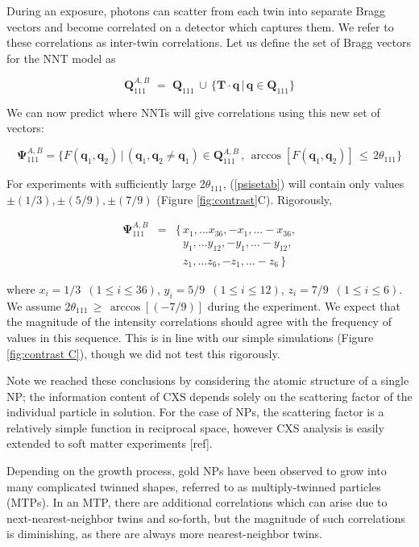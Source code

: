 \documentclass [11pt,fleqn]{article}
\def \be {\begin{equation}}
\def \ee {\end{equation}}
\def \beq {\begin{eqnarray}}
\def \eeq {\end{eqnarray}}
\begin{document}
During an exposure, photons can scatter from each twin into separate Bragg vectors and become correlated on a detector which captures them. We refer to these correlations as inter-twin correlations. Let us define the set of Bragg vectors for the NNT model as 

\be
\bm Q^{A,B}_{111}\,\, =\,\, \bm Q_{111} \, \cup \, \{  \mathbf T  \cdot \bm q \, \big |\, \bm q \in \bm Q_{111} \}
\ee

We can now predict where NNTs will give correlations using this new set of vectors: 

\be \label{psisetab}
\bm \Psi^{A,B}_{111} = \{ F( \bm q_1, \bm q_2)\, \big | \, (\bm q_1, \bm q_2 \ne \bm q_1) \in \bm Q^{A,B}_{111}\, ,\,  \arccos [F( \bm q_1, \bm q_2)]  \, \le \,  2\theta_{111}     \}
\ee

For experiments with sufficiently large $2\theta_{111}$, (\ref{psisetab}) will contain only values $\pm (1/3), \pm (5/9), \pm(7/9)$ (Figure \ref{fig:contrast}C). Rigorously, 

\beq
\bm \Psi^{A,B}_{111} &=& \{\, x_1, ... x_{36}, -x_1, ... -x_{36},  \\
&&\,\,\,\, y_1, ... y_{12}, -y_1, ... -y_{12}, \\
&& \,\,\,\, z_1, ... z_6, -z_1, ... -z_6 \, \}
\eeq

where $x_i = 1/3\,\,\, (1 \le i \le 36 )$, $y_i = 5/9\,\,\, (1 \le i \le 12 )$, $z_i = 7/9\,\,\, (1 \le i \le 6 )$.  We assume $  2\theta_{111} \, \ge \, \arccos \left[(-7/9)\right ]  $ during the experiment. We expect that the magnitude of the intensity correlations should agree with the frequency of values in this sequence. This is in line with our simple simulations (Figure \ref{fig:contrast C}), though we did not test this rigorously.

Note we reached these conclusions by considering the atomic structure of a single NP; the information content of CXS depends solely on the scattering factor of the individual particle in solution. For the case of NPs, the scattering factor is a relatively simple function in reciprocal space, however CXS analysis is easily extended to soft matter experiments [ref].

Depending on the growth process, gold NPs have been observed to grow into many complicated twinned shapes, referred to as multiply-twinned particles (MTPs). In an MTP, there are additional correlations which can arise due to next-nearest-neighbor twins and so-forth, but the magnitude of such correlations is diminishing, as there are always more nearest-neighbor twins. 
\end{document}
